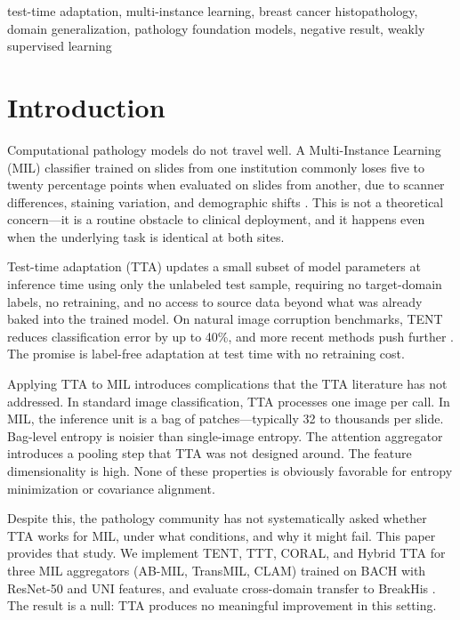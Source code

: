 \documentclass[conference]{IEEEtran}
\begin{document}
\begin{IEEEkeywords}
test-time adaptation, multi-instance learning, breast cancer histopathology, domain generalization, pathology foundation models, negative result, weakly supervised learning
\end{IEEEkeywords}

\section{Introduction}

Computational pathology models do not travel well. A Multi-Instance Learning (MIL) classifier trained on slides from one institution commonly loses five to twenty percentage points when evaluated on slides from another, due to scanner differences, staining variation, and demographic shifts \cite{chen2022scaling, lu2021data}. This is not a theoretical concern---it is a routine obstacle to clinical deployment, and it happens even when the underlying task is identical at both sites.

Test-time adaptation (TTA) updates a small subset of model parameters at inference time using only the unlabeled test sample, requiring no target-domain labels, no retraining, and no access to source data beyond what was already baked into the trained model. On natural image corruption benchmarks, TENT reduces classification error by up to 40\%, and more recent methods push further \cite{niu2023towards, liu2021ttt, wang2022cotta, niu2022eata, yuan2023rotta}. The promise is label-free adaptation at test time with no retraining cost.

Applying TTA to MIL introduces complications that the TTA literature has not addressed. In standard image classification, TTA processes one image per call. In MIL, the inference unit is a bag of patches---typically 32 to thousands per slide. Bag-level entropy is noisier than single-image entropy. The attention aggregator introduces a pooling step that TTA was not designed around. The feature dimensionality is high. None of these properties is obviously favorable for entropy minimization or covariance alignment.

Despite this, the pathology community has not systematically asked whether TTA works for MIL, under what conditions, and why it might fail. This paper provides that study. We implement TENT, TTT, CORAL, and Hybrid TTA for three MIL aggregators (AB-MIL, TransMIL, CLAM) trained on BACH with ResNet-50 and UNI features, and evaluate cross-domain transfer to BreakHis \cite{spanhol2016dataset}. The result is a null: TTA produces no meaningful improvement in this setting.
\end{document}
